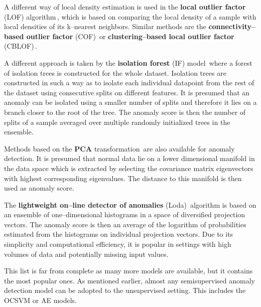 A different way of local density estimation is used in the \textbf{local
outlier factor} (LOF) algorithm\,\cite{breunig2000lof}, which is
based on comparing the local density of a sample with local densities
of its k--nearest neighbors. Similar methods are the \textbf{connectivity--based
outlier factor} (COF)\,\cite{tang2002enhancing} or \textbf{clustering--based
local outlier factor} (CBLOF)\,\cite{he2003discovering}.

A different approach is taken by the \textbf{isolation forest }(IF)
model\,\cite{liu2008isolation} where a forest of isolation trees
is constructed for the whole dataset. Isolation trees are constructed
in such a way as to isolate each individual datapoint from the rest
of the dataset using consecutive splits on different features. It
is presumed that an anomaly can be isolated using a smaller number
of splits and therefore it lies on a branch closer to the root of
the tree. The anomaly score is then the number of splits of a sample
averaged over multiple randomly initialized trees in the ensemble.

Methods based on the \textbf{PCA }transformation\,\cite{shyu2003novel,aggarwal2015outlier}\textbf{
}are also available for anomaly detection. It is presumed that normal
data lie on a lower dimensional manifold in the data space which is
extracted by selecting the covariance matrix eigenvectors with highest
corresponding eigenvalues. The distance to this manifold is then used
as anomaly score.

The \textbf{lightweight on--line detector of anomalies} (Loda)\,\cite{pevny2016loda}
algorithm is based on an ensemble of one--dimensional histograms
in a space of diversified projection vectors. The anomaly score is
then an average of the logarithm of probabilities estimated from the
histograms on individual projection vectors. Due to its simplicity
and computational efficiency, it is popular in settings with high
volumes of data and potentially missing input values.

This list is far from complete as many more models are available,
but it contains the most popular ones. As mentioned earlier, almost
any semisupervised anomaly detection model can be adopted to the unsupervised
setting. This includes the OCSVM or AE models.


